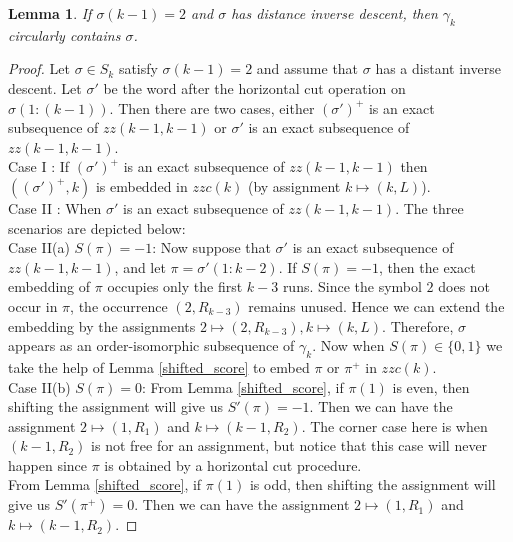 \documentclass[a4paper,12pt]{article}
\newtheorem{lemma}[theorem]{Lemma}
\theoremstyle{definition}
\numberwithin{equation}{section}
\begin{document}
\begin{lemma}\label{2boundaryDID}
If $\sigma(k-1)=2$ and $\sigma$ has distance inverse descent, then $\gamma_k$ circularly contains $\sigma$.
\end{lemma}
\begin{proof}
Let $\sigma \in S_k$ satisfy $\sigma(k-1)=2$ and assume that $\sigma$
has a distant inverse descent. 
Let $\sigma'$ be the word after the horizontal cut operation on $\sigma(1:(k-1))$. Then there are two cases, either $(\sigma')^+$ is an exact subsequence of $zz(k-1,k-1)$ or $\sigma'$ is an exact subsequence of $zz(k-1,k-1)$. \\
Case I :
If $(\sigma')^+$ is an exact subsequence of $zz(k-1,k-1)$ then $((\sigma')^+,k)$ is embedded in $zzc(k)$ (by assignment $k \mapsto (k,L)$). \\

Case II : When $\sigma'$ is an exact subsequence of $zz(k-1,k-1)$. The three scenarios are depicted below:\\
Case II(a)   $S(\pi) = -1$:
Now suppose that $\sigma'$ is an exact subsequence of $zz(k-1,k-1)$, and let
$\pi=\sigma'(1:k-2)$.
If $S(\pi)=-1$, then the exact embedding of $\pi$ occupies only the first
$k-3$ runs. Since the symbol $2$ does not occur in $\pi$, the occurrence
$(2,R_{k-3})$ remains unused. Hence we can extend the embedding by the
assignments
$
2\mapsto(2,R_{k-3}), 
k\mapsto(k,L).
$
Therefore, $\sigma$ appears as an order-isomorphic subsequence of $\gamma_k$.
Now when $S(\pi) \in \{ 0, 1\}$ we take the help of Lemma \ref{shifted_score} to embed $\pi$ or $\pi^+$ in $zzc(k)$. \\

Case II(b) $S(\pi) = 0$:
From Lemma \ref{shifted_score}, if $\pi(1)$ is even, then shifting the assignment will give us $S'(\pi) = -1$. Then we can have the assignment $2 \mapsto (1,R_1)$ and $k \mapsto (k-1,R_2)$. The corner case here is when $(k-1,R_2)$ is not free for an assignment, but notice that this case will never happen since $\pi$ is obtained by a horizontal cut procedure. \\

From Lemma \ref{shifted_score}, if $\pi(1)$ is odd, then shifting the assignment will give us $S'(\pi^+) = 0$. Then we can have the assignment $2 \mapsto (1,R_1)$ and $k \mapsto (k-1,R_2)$. 


\end{proof}
\end{document}
